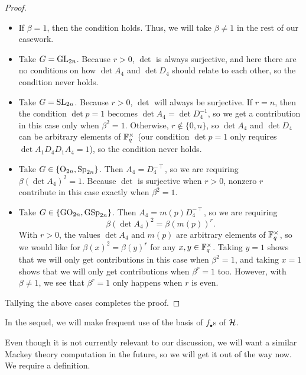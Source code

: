 \begin{proof}
\begin{itemize}
        \item If $\beta=1$, then the condition holds. Thus, we will take $\beta\ne1$ in the rest of our casework.
        \item Take $G=\mathrm{GL}_{2n}$. Because $r>0$, $\det$ is always surjective, and here there are no conditions on how $\det A_4$ and $\det D_4$ should relate to each other, so the condition never holds.
        \item Take $G=\mathrm{SL}_{2n}$. Because $r>0$, $\det$ will always be surjective. If $r=n$, then the condition $\det p=1$ becomes $\det A_4=\det D_4^{-1}$, so we get a contribution in this case only when $\beta^2=1$. Otherwise, $r\notin\{0,n\}$, so $\det A_4$ and $\det D_4$ can be arbitrary elements of $\mathbb F_q^\times$ (our condition $\det p=1$ only requires $\det A_1D_4D_1A_4=1$), so the condition never holds.
        \item Take $G\in\{\mathrm{O}_{2n},\mathrm{Sp}_{2n}\}$. Then $A_4=D_4^{-\intercal}$, so we are requiring $\beta(\det A_4)^2=1$. Because $\det$ is surjective when $r>0$, nonzero $r$ contribute in this case exactly when $\beta^2=1$.
        \item Take $G\in\{\mathrm{GO}_{2n},\mathrm{GSp}_{2n}\}$. Then $A_4=m(p)D_4^{-\intercal}$, so we are requiring
        \[\beta(\det A_4)^2=\beta(m(p))^r.\]
        With $r>0$, the values $\det A_4$ and $m(p)$ are arbitrary elements of $\mathbb F_q^\times$, so we would like for $\beta(x)^2=\beta(y)^r$ for any $x,y\in\mathbb F_q^\times$. Taking $y=1$ shows that we will only get contributions in this case when $\beta^2=1$, and taking $x=1$ shows that we will only get contributions when $\beta^r=1$ too. However, with $\beta\ne1$, we see that $\beta^r=1$ only happens when $r$ is even.
    \end{itemize}
    Tallying the above cases completes the proof.
\end{proof}
\begin{remark}
    In the sequel, we will make frequent use of the basis of $f_\bullet$s of $\mathcal{H}$.
\end{remark}
Even though it is not currently relevant to our discussion, we will want a similar Mackey theory computation in the future, so we will get it out of the way now. We require a definition.
